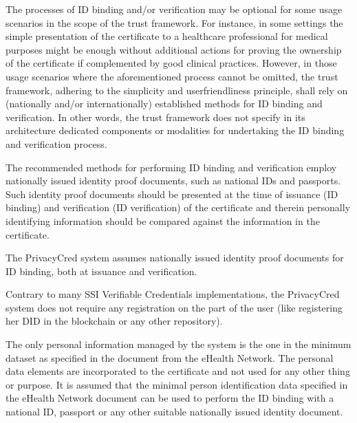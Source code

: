\documentclass[a4paper,12pt,english]{sphinxhowto}
\begin{document}
\sphinxAtStartPar
The processes of ID binding and/or verification may be optional for some usage scenarios in the scope of the trust framework. For instance, in some settings the simple presentation of the certificate to a healthcare professional for medical purposes might be enough without additional actions for proving the ownership of the certificate if complemented by good clinical practices. However, in those usage scenarios where the aforementioned process cannot be omitted, the trust framework, adhering to the simplicity and user\sphinxhyphen{}friendliness principle, shall rely on (nationally and/or internationally) established methods for ID binding and verification. In other words, the trust framework does not specify in its architecture dedicated components or modalities for undertaking the ID binding and verification process.

\sphinxAtStartPar
The recommended methods for performing ID binding and verification employ nationally issued identity proof documents, such as national IDs and passports. Such identity proof documents should be presented at the time of issuance (ID binding) and verification (ID verification) of the certificate and therein personally identifying information should be compared against the information in the certificate.

\begin{sphinxShadowBox}

\sphinxAtStartPar
The PrivacyCred system assumes nationally issued identity proof documents for ID binding, both at issuance and verification.

\sphinxAtStartPar
Contrary to many SSI Verifiable Credentials implementations, the PrivacyCred system does not require any registration on the part of the user (like registering her DID in the blockchain or any other repository).

\sphinxAtStartPar
The only personal information managed by the system is the one in the minimum dataset as specified in the document  from the eHealth Network.
The personal data elements are incorporated to the certificate and not used for any other thing or purpose.
It is assumed that the minimal person identification data specified in the eHealth Network document can be used to perform the ID binding with a national ID, passport or any other suitable nationally issued identity document.
\end{sphinxShadowBox}
\end{document}
